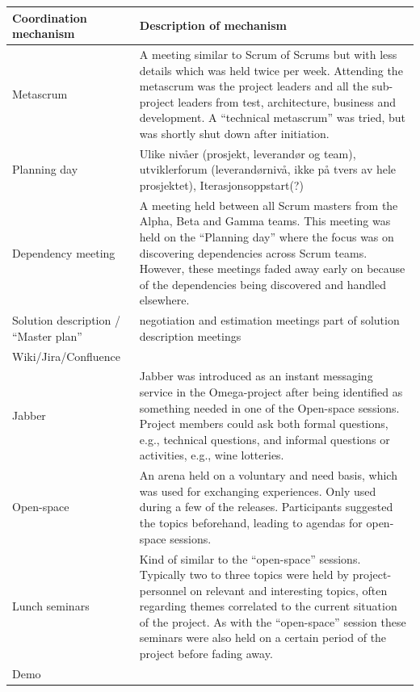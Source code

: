 \begin{table}[H]
\begin{center}
    \begin{tabular}{| p{6cm} | p{9cm} |}
    \hline
    \textbf{Coordination mechanism} & \textbf{Description of mechanism} \\ \hline
    Metascrum & A meeting similar to Scrum of Scrums but with less details which was held twice per week. Attending the metascrum was the project leaders and all the sub-project leaders from test, architecture, business and development. A ``technical metascrum'' was tried, but was shortly shut down after initiation. \\ \hline
    Planning day & Ulike nivåer (prosjekt, leverandør og team), utviklerforum (leverandørnivå, ikke på tvers av hele prosjektet), Iterasjonsoppstart(?) \\ \hline
    Dependency meeting & A meeting held between all Scrum masters from the Alpha, Beta and Gamma teams. This meeting was held on the ``Planning day'' where the focus was on discovering dependencies across Scrum teams. However, these meetings faded away early on because of the dependencies being discovered and handled elsewhere. \\ \hline
    Solution description / ``Master plan'' & negotiation and estimation meetings part of solution description meetings \\ \hline
    Wiki/Jira/Confluence & \\ \hline
    Jabber & Jabber was introduced as an instant messaging service in the Omega-project after being identified as something needed in one of the Open-space sessions. Project members could ask both formal questions, e.g., technical questions, and informal questions or activities, e.g., wine lotteries. \\ \hline
    Open-space & An arena held on a voluntary and need basis, which was used for exchanging experiences. Only used during a few of the releases. Participants suggested the topics beforehand, leading to agendas for open-space sessions. \\ \hline
    Lunch seminars & Kind of similar to the ``open-space'' sessions. Typically two to three topics were held by project-personnel on relevant and interesting topics, often regarding themes correlated to the current situation of the project. As with the ``open-space'' session these seminars were also held on a certain period of the project before fading away. \\ \hline
    Demo &  \\ \hline

\end{tabular}
\end{center}
\end{table}
